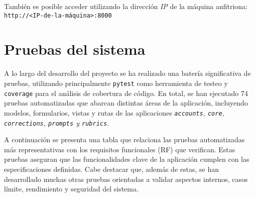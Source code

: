 También es posible acceder utilizando la dirección \textit{IP} de la máquina anfitriona: \texttt{http://<IP-de-la-máquina>:8000}
\section{Pruebas del sistema}

A lo largo del desarrollo del proyecto se ha realizado una batería significativa de pruebas, utilizando principalmente \texttt{pytest} como herramienta de testeo y \texttt{coverage} para el análisis de cobertura de código. En total, se han ejecutado 74 pruebas automatizadas que abarcan distintas áreas de la aplicación, incluyendo modelos, formularios, vistas y rutas de las aplicaciones \emph{\texttt{accounts}, \texttt{core}, \texttt{corrections}, \texttt{prompts} y \texttt{rubrics}}.

A continuación se presenta una tabla que relaciona las pruebas automatizadas más representativas con los requisitos funcionales (RF) que verifican. Estas pruebas aseguran que las funcionalidades clave de la aplicación cumplen con las especificaciones definidas. Cabe destacar que, además de estas, se han desarrollado muchas otras pruebas orientadas a validar aspectos internos, casos límite, rendimiento y seguridad del sistema.
\newpage

